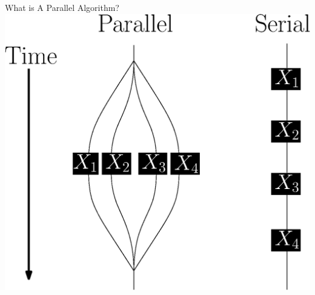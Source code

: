 \documentclass[table,serif,mathserif,final]{beamer}
\theoremstyle{remark}
\begin{document}
\begin{frame}
\begin{block}{\Huge What is A Parallel Algorithm?}
  \centering
  \includegraphics[width=0.8\linewidth]{imgs/parallelForLoop/serialParallelComparison.eps}
\end{block}
\vspace{1cm}


\end{frame}
\end{document}
